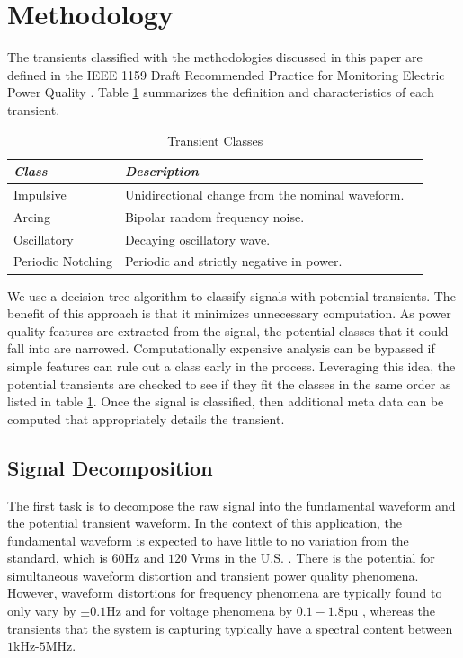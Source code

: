 \documentclass[10pt, conference, compsocconf]{IEEEtran}
\begin{document}
\section{Methodology}
\label{sec:Methodology}
The transients classified with the methodologies discussed in this paper are  defined in the IEEE 1159 Draft Recommended Practice for Monitoring Electric Power Quality \cite{IEEE:2018:1159D3}. Table \ref{TransientClasses} summarizes the definition and characteristics of each transient.

%
\begin{table}[htbp]
\caption{Transient Classes}\label{TransientClasses}
\centering%
\begin{tabular}{lll}
\hline
\textit{Class} & \textit{Description} \\
\hline
Impulsive & Unidirectional change from the nominal waveform. \\
Arcing & Bipolar random frequency noise. \\
Oscillatory & Decaying oscillatory wave. \\
Periodic Notching & Periodic and strictly negative in power. \\
\hline
\end{tabular}
\end{table}
%

We use a decision tree algorithm to classify signals with potential transients. The benefit of this approach is that it minimizes unnecessary computation. As power quality features are extracted from the signal, the potential classes that it could fall into are narrowed. Computationally expensive analysis can be bypassed if simple features can rule out a class early in the process. Leveraging this idea, the potential transients are checked to see if they fit the classes in the same order as listed in table \ref{TransientClasses}. Once the signal is classified, then additional meta data can be computed that appropriately details the transient.

\subsection{Signal Decomposition}

The first task is to decompose the raw signal into the fundamental waveform and the potential transient waveform. In the context of this application, the fundamental waveform is expected to have little to no variation from the standard, which is $60$Hz and $120$ Vrms in the U.S. \cite{ANSI:2016:C84.1-2016}. There is the potential for simultaneous waveform distortion and transient power quality phenomena. However, waveform distortions for frequency phenomena are typically found to only vary by $\pm 0.1$Hz and for voltage phenomena by $0.1-1.8$pu \cite{IEEE:2018:1159D3}, whereas the transients that the system is capturing typically have a spectral content between $1$kHz-$5$MHz.
\end{document}
